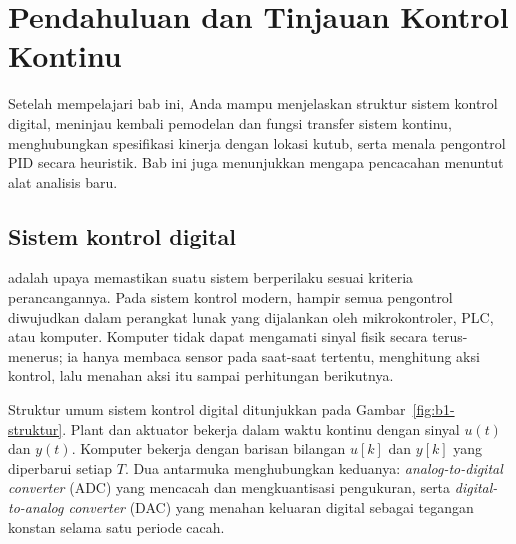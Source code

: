 \chapter{Pendahuluan dan Tinjauan Kontrol Kontinu}

\begin{tujuan}
	Setelah mempelajari bab ini, Anda mampu menjelaskan struktur sistem kontrol digital, meninjau kembali pemodelan dan fungsi transfer sistem kontinu, menghubungkan spesifikasi kinerja dengan lokasi kutub, serta menala pengontrol PID secara heuristik. Bab ini juga menunjukkan mengapa pencacahan menuntut alat analisis baru.
\end{tujuan}

\section{Sistem kontrol digital}
 adalah upaya memastikan suatu sistem berperilaku sesuai kriteria perancangannya. Pada sistem kontrol modern, hampir semua pengontrol diwujudkan dalam perangkat lunak yang dijalankan oleh mikrokontroler, PLC, atau komputer. Komputer tidak dapat mengamati sinyal fisik secara terus-menerus; ia hanya membaca sensor pada saat-saat tertentu, menghitung aksi kontrol, lalu menahan aksi itu sampai perhitungan berikutnya.

Struktur umum sistem kontrol digital ditunjukkan pada Gambar~\ref{fig:b1-struktur}. Plant dan aktuator bekerja dalam waktu kontinu dengan sinyal $u(t)$ dan $y(t)$. Komputer bekerja dengan barisan bilangan $u[k]$ dan $y[k]$ yang diperbarui setiap  $T$. Dua antarmuka menghubungkan keduanya: \textit{analog-to-digital converter} (ADC) yang mencacah dan mengkuantisasi pengukuran, serta \textit{digital-to-analog converter} (DAC) yang menahan keluaran digital sebagai tegangan konstan selama satu periode cacah.


